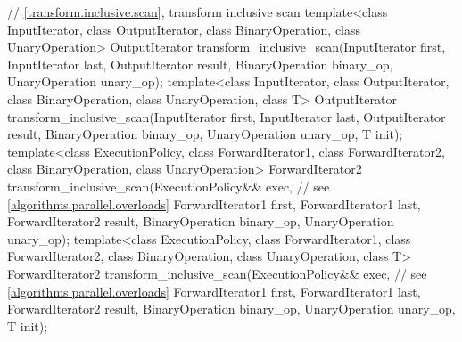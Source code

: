 \begin{codeblock}
{  // \ref{transform.inclusive.scan}, transform inclusive scan
  template<class InputIterator, class OutputIterator,
           class BinaryOperation, class UnaryOperation>
    OutputIterator transform_inclusive_scan(InputIterator first, InputIterator last,
                                            OutputIterator result,
                                            BinaryOperation binary_op,
                                            UnaryOperation unary_op);
  template<class InputIterator, class OutputIterator,
           class BinaryOperation, class UnaryOperation, class T>
    OutputIterator transform_inclusive_scan(InputIterator first, InputIterator last,
                                            OutputIterator result,
                                            BinaryOperation binary_op,
                                            UnaryOperation unary_op,
                                            T init);
  template<class ExecutionPolicy,
           class ForwardIterator1, class ForwardIterator2,
           class BinaryOperation, class UnaryOperation>
    ForwardIterator2 transform_inclusive_scan(ExecutionPolicy&& exec, // see \ref{algorithms.parallel.overloads}
                                              ForwardIterator1 first, ForwardIterator1 last,
                                              ForwardIterator2 result,
                                              BinaryOperation binary_op,
                                              UnaryOperation unary_op);
  template<class ExecutionPolicy,
           class ForwardIterator1, class ForwardIterator2,
           class BinaryOperation, class UnaryOperation, class T>
    ForwardIterator2 transform_inclusive_scan(ExecutionPolicy&& exec, // see \ref{algorithms.parallel.overloads}
                                              ForwardIterator1 first, ForwardIterator1 last,
                                              ForwardIterator2 result,
                                              BinaryOperation binary_op,
                                              UnaryOperation unary_op,
                                              T init);

}
\end{codeblock}
